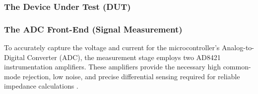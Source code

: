 

\subsubsection{The Device Under Test (DUT)}


\subsubsection{The ADC Front-End (Signal Measurement)}
To accurately capture the voltage and current for the microcontroller's Analog-to-Digital Converter (ADC), the measurement stage employs two AD8421 instrumentation amplifiers. These amplifiers provide the necessary high common-mode rejection, low noise, and precise differential sensing required for reliable impedance calculations \cite{ad8421_datasheet}.

